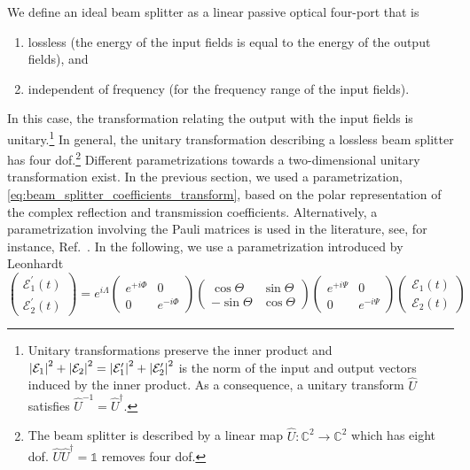 We define an ideal beam splitter as a linear passive optical four-port that is
\begin{enumerate}
    \item lossless (the energy of the input fields is equal to the energy of the output fields), and
    \item independent of frequency (for the frequency range of the input fields).
\end{enumerate}
In this case, the transformation relating the output with the input fields is unitary.\footnote{Unitary transformations preserve the inner product and $\abs{\mathcal{E}_1}^2+\abs{\mathcal{E}_2}^2=\abs{\mathcal{E}^\prime_1}^2+\abs{\mathcal{E}^\prime_2}^2$ is the norm of the input and output vectors induced by the inner product. As a consequence, a unitary transform $\hat{U}$ satisfies $\hat{U}^{-1}=\hat{U}^\dagger$.}
In general, the unitary transformation describing a lossless beam splitter has four \gls{dof}.\footnote{The beam splitter is described by a linear map $\hat{U}\colon\mathbb{C}^2\to\mathbb{C}^2$ which has eight \gls{dof}. $\hat{U}\hat{U}^\dagger=\mathbb{1}$ removes four \gls{dof}.}
Different parametrizations towards a two-dimensional unitary transformation exist.
In the previous section, we used a parametrization, \cref{eq:beam_splitter_coefficients_transform}, based on the polar representation of the complex reflection and transmission coefficients.
Alternatively, a parametrization involving the Pauli matrices is used in the literature, see, for instance, Ref.~\cite{Zeilinger1981}.
In the following, we use a parametrization introduced by Leonhardt~\cite[p.~92]{Leonhardt2010}
\begin{equation}
    \begin{pmatrix}
        \mathcal{E}_1^\prime(t)
        \\
        \mathcal{E}_2^\prime(t)
    \end{pmatrix}
    =
    e^{i\Lambda}
    \begin{pmatrix}
        e^{+i\Phi} & 0
        \\
        0 & e^{-i\Phi}
    \end{pmatrix}
    \begin{pmatrix}
        \cos\Theta & \sin\Theta
        \\
        -\sin\Theta & \cos\Theta
    \end{pmatrix}
    \begin{pmatrix}
        e^{+i\Psi} & 0
        \\
        0 & e^{-i\Psi}
    \end{pmatrix}
    \begin{pmatrix}
        \mathcal{E}_1(t)
        \\
        \mathcal{E}_2(t)
    \end{pmatrix}
    \label{eq:beam_splitter_unitary_transform}
\end{equation}
